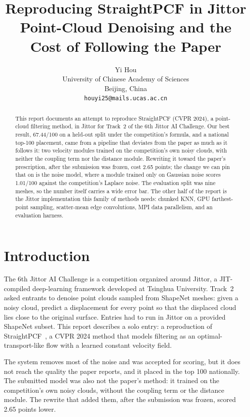 \documentclass{article}
\title{Reproducing StraightPCF in Jittor\\[0.15em]
\large Point-Cloud Denoising and the Cost of Following the Paper}
\author{%
  Yi Hou \\
  University of Chinese Academy of Sciences\\
  Beijing, China \\
  \texttt{houyi25@mails.ucas.ac.cn}
}
\begin{document}
\maketitle

\begin{abstract}
This report documents an attempt to reproduce StraightPCF (CVPR 2024), a point-cloud filtering method, in Jittor for Track~2 of the 6th Jittor AI Challenge. Our best result, 67.44/100 on a held-out split under the competition's formula, and a national top-100 placement, came from a pipeline that deviates from the paper as much as it follows it: two velocity modules trained on the competition's own noisy clouds, with neither the coupling term nor the distance module. Rewriting it toward the paper's prescription, after the submission was frozen, cost 2.65 points; the change we can pin that on is the noise model, where a module trained only on Gaussian noise scores 1.01/100 against the competition's Laplace noise. The evaluation split was nine meshes, so the number itself carries a wide error bar. The other half of the report is the Jittor implementation this family of methods needs: chunked KNN, GPU farthest-point sampling, scatter-mean edge convolutions, MPI data parallelism, and an evaluation harness.
\end{abstract}

\section{Introduction}

The 6th Jittor AI Challenge is a competition organized around Jittor, a JIT-compiled deep-learning framework developed at Tsinghua University. Track~2 asked entrants to denoise point clouds sampled from ShapeNet meshes: given a noisy cloud, predict a displacement for every point so that the displaced cloud lies close to the original surface. Entries had to run in Jittor on a provided ShapeNet subset. This report describes a solo entry: a reproduction of StraightPCF~\citep{straightpcf}, a CVPR 2024 method that models filtering as an optimal-transport-like flow with a learned constant velocity field.

The system removes most of the noise and was accepted for scoring, but it does not reach the quality the paper reports, and it placed in the top 100 nationally. The submitted model was also not the paper's method: it trained on the competition's own noisy clouds, without the coupling term or the distance module. The rewrite that added them, after the submission was frozen, scored 2.65 points lower.
\end{document}
